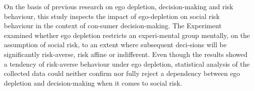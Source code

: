\onehalfspacing
On the basis of previous research on ego depletion, decision-making and risk behaviour, this study inspects the impact of ego-depletion on social risk behaviour in the context of con-sumer decision-making. The Experiment examined whether ego depletion restricts an experi-mental group mentally, on the assumption of social risk, to an extent where subsequent deci-sions will be significantly risk-averse, risk affine or indifferent. Even though the results showed a tendency of risk-averse behaviour under ego depletion, statistical analysis of the collected data could neither confirm nor fully reject a dependency between ego depletion and decision-making when it comes to social risk.